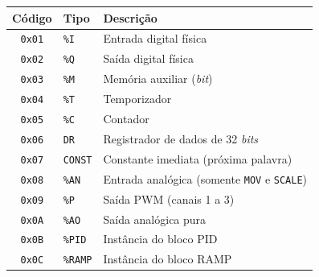 \begin{quadrofixo}
    \centering
    \begin{tabular}{|c|l|p{7.6cm}|}
        \hline
        Código & Tipo & Descrição \\
        \hline
        \texttt{0x01} & \texttt{\%I} & Entrada digital física \\
        \hline
        \texttt{0x02} & \texttt{\%Q} & Saída digital física \\
        \hline
        \texttt{0x03} & \texttt{\%M} & Memória auxiliar (\textit{bit}) \\
        \hline
        \texttt{0x04} & \texttt{\%T} & Temporizador \\
        \hline
        \texttt{0x05} & \texttt{\%C} & Contador \\
        \hline
        \texttt{0x06} & \texttt{DR} & Registrador de dados de 32 \textit{bits} \\
        \hline
        \texttt{0x07} & \texttt{CONST} & Constante imediata (próxima palavra) \\
        \hline
        \texttt{0x08} & \texttt{\%AN} & Entrada analógica (somente \texttt{MOV} e \texttt{SCALE}) \\
        \hline
        \texttt{0x09} & \texttt{\%P} & Saída PWM (canais 1 a 3) \\
        \hline
        \texttt{0x0A} & \texttt{\%AO} & Saída analógica pura \\
        \hline
        \texttt{0x0B} & \texttt{\%PID} & Instância do bloco PID \\
        \hline
        \texttt{0x0C} & \texttt{\%RAMP} & Instância do bloco RAMP \\
        \hline
    \end{tabular}

    \label{qua:ape-tipos}
\end{quadrofixo}

